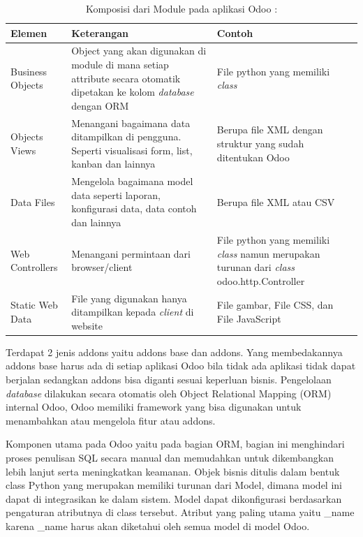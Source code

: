 \begingroup
\setlength{\LTleft}{-20cm plus -1fill}
\setlength{\LTright}{\LTleft}
\begin{small}
	\begin{longtable}{|p{2.5cm}|p{6cm}|p{4.5cm}|}
		\caption{Komposisi dari Module pada aplikasi Odoo \cite{odoo}:}\\
		\hline
		\textbf{Elemen} & \textbf{Keterangan} & \textbf{Contoh}\\
		\endfirsthead
		
		\hline
		    Business Objects
		  & Object yang akan digunakan di module di mana setiap attribute secara otomatik dipetakan ke kolom \textit{database} dengan ORM
		  & File python yang memiliki \textit{class}\\
		\hline  
		Objects Views
		  & Menangani bagaimana data ditampilkan di pengguna. Seperti visualisasi form, list, kanban dan lainnya
		  & Berupa file XML dengan struktur yang sudah ditentukan Odoo\\
		\hline
		Data Files
		  & Mengelola bagaimana model data seperti laporan, konfigurasi data, data contoh dan lainnya
		  & Berupa file XML atau CSV\\
		\hline
		Web Controllers
		  & Menangani permintaan dari browser/client
		  & File python yang memiliki \textit{class} namun merupakan turunan dari \textit{class} odoo.http.Controller\\
		\hline
		  Static Web Data
		  & File yang digunakan hanya ditampilkan kepada \textit{client} di website
		  & File gambar, File CSS, dan File JavaScript\\
		 \hline  
	\end{longtable}
\end{small}
\endgroup
Terdapat 2 jenis addons yaitu addons base dan addons. Yang membedakannya addons base harus ada di setiap aplikasi Odoo bila tidak ada aplikasi tidak dapat berjalan sedangkan addons bisa diganti sesuai keperluan bisnis. Pengelolaan \textit{database} dilakukan secara otomatis oleh Object Relational Mapping (ORM) internal Odoo, Odoo memiliki framework yang bisa digunakan untuk menambahkan atau mengelola fitur atau addons. 

Komponen utama pada Odoo yaitu pada bagian ORM, bagian ini menghindari proses penulisan SQL secara manual dan memudahkan untuk dikembangkan lebih lanjut serta meningkatkan keamanan. Objek bisnis ditulis dalam bentuk class Python yang merupakan memiliki turunan dari Model, dimana model ini dapat di integrasikan ke dalam sistem. Model dapat dikonfigurasi berdasarkan pengaturan atributnya di class tersebut. Atribut yang paling utama yaitu {\_}name karena {\_}name harus akan diketahui oleh semua model di model Odoo.

